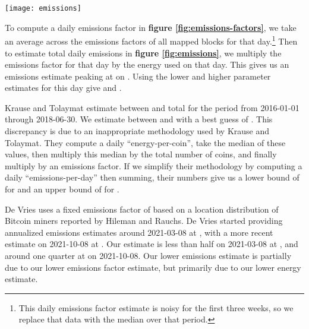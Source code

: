 \begin{figure*}[htp]
    \centering
    \texttt{[image: emissions]}
    \caption{Ethereum emissions in \SI{}{\kilo\ton\COtwo\per{day}} and equivalent annualized \SI{}{\mega\ton\COtwo\per{year}} based on energy usage, block metadata, and regional emissions factors. Shaded region shows the range between our lower and upper estimates.}
    \label{fig:emissions}
\end{figure*}

To compute a daily emissions factor in \textbf{figure \ref{fig:emissions-factors}}, we take an average across the emissions factors of all mapped blocks for that day.\footnote{This daily emissions factor estimate is noisy for the first three weeks, so we replace that data with the median over that period.} Then to estimate total daily emissions in \textbf{figure \ref{fig:emissions}}, we multiply the emissions factor for that day by the energy used on that day. This gives us an emissions estimate peaking at  on . Using the lower and higher parameter estimates for this day give  and .

Krause and Tolaymat estimate between  and  total for the period from 2016-01-01 through 2018-06-30. We estimate between  and  with a best guess of . This discrepancy is due to an inappropriate methodology used by Krause and Tolaymat. They compute a daily ``energy-per-coin'', take the median of these values, then multiply this median by the total number of coins, and finally multiply by an emissions factor. If we simplify their methodology by computing a daily ``emissions-per-day'' then summing, their numbers give us a lower bound of  for  and an upper bound of  for .

De Vries uses a fixed emissions factor of  based on a location distribution of Bitcoin miners reported by Hileman and Rauchs\cite{hileman_2017_2017}. De Vries started providing annualized emissions estimates around 2021-03-08 at , with a more recent estimate on 2021-10-08 at . Our estimate is less than half on 2021-03-08 at , and around one quarter at  on 2021-10-08. Our lower emissions estimate is partially due to our lower emissions factor estimate, but primarily due to our lower energy estimate.

